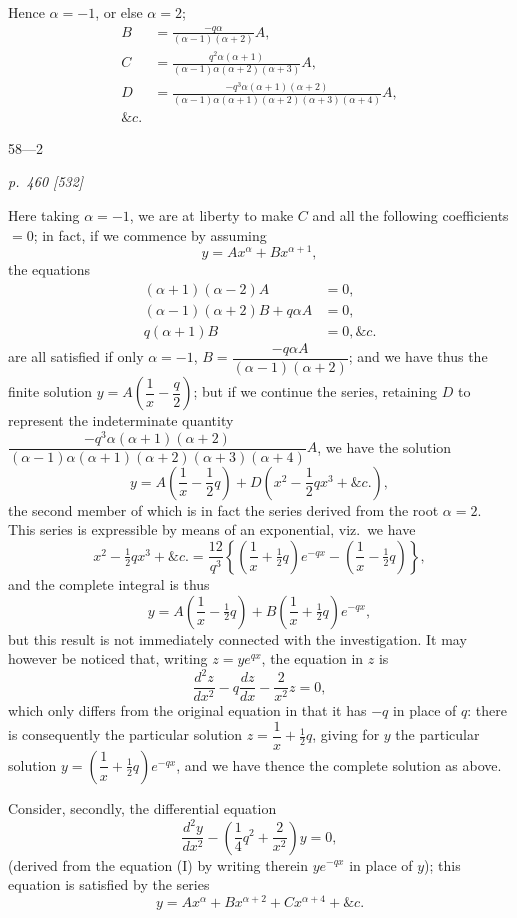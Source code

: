 \documentclass[11pt,a4paper]{article}
\theoremstyle{plain}
\theoremstyle{definition}
\begin{document}
Hence $\alpha=-1$, or else $\alpha=2$;
\begin{align*}
B&=\frac{-q\alpha}{(\alpha-1)(\alpha+2)}A,\\
C&=\frac{q^2\alpha(\alpha+1)}{(\alpha-1)\alpha(\alpha+2)(\alpha+3)}A,\\
D&=\frac{-q^3\alpha(\alpha+1)(\alpha+2)}{(\alpha-1)\alpha(\alpha+1)(\alpha+2)(\alpha+3)(\alpha+4)}A,\\
\&c.
\end{align*}

\hfill 58---2

\clearpage

\bigskip
\textit{p.~460 [532]}
\smallskip

Here taking $\alpha = -1$, we are at liberty to make $C$ and all the following coefficients
$=0$; in fact, if we commence by assuming
\[
y = Ax^\alpha + Bx^{\alpha+1},
\]
the equations
\begin{align*}
(\alpha+1)(\alpha-2)A&=0,\\
(\alpha-1)(\alpha+2)B+q\alpha A&=0,\\
q(\alpha+1)B&=0,
\&c.
\end{align*}
are all satisfied if only $\alpha=-1$,
$B=\dfrac{-q\alpha A}{(\alpha-1)(\alpha+2)}$; and we have thus the finite
solution $y=A\left(\dfrac1x-\dfrac q2\right)$; but if we continue the series, retaining $D$ to represent the
indeterminate quantity
$\dfrac{-q^3\alpha(\alpha+1)(\alpha+2)}{(\alpha-1)\alpha(\alpha+1)(\alpha+2)(\alpha+3)(\alpha+4)}A$, we have the solution
\[
y=A\left(\frac1x-\frac12 q\right)+D\left(x^2-\frac12 qx^3+\&c.\right),
\]
the second member of which is in fact the series derived from the root $\alpha=2$.
This series is expressible by means of an exponential, viz.\ we have
\[
x^2-\tfrac12 qx^3+\&c.=\frac{12}{q^3}\left\{\left(\frac1x+\tfrac12q\right)e^{-qx}
-\left(\frac1x-\tfrac12q\right)\right\},
\]
and the complete integral is thus
\[
y=A\left(\frac1x-\tfrac12q\right)+B\left(\frac1x+\tfrac12q\right)e^{-qx},
\]
but this result is not immediately connected with the investigation. It may however
be noticed that, writing $z=ye^{qx}$, the equation in $z$ is
\[
\frac{d^2z}{dx^2}-q\frac{dz}{dx}-\frac{2}{x^2}z=0,
\]
which only differs from the original equation in that it has $-q$ in place of $q$:
there is consequently the particular solution $z=\dfrac1x+\tfrac12q$, giving for $y$ the particular
solution $y=\left(\dfrac1x+\tfrac12q\right)e^{-qx}$, and we have thence the complete solution as above.

Consider, secondly, the differential equation
\[
\frac{d^2y}{dx^2}-\left(\frac14q^2+\frac{2}{x^2}\right)y=0 \tag{II},
\]
(derived from the equation (I) by writing therein $ye^{-qx}$ in place of $y$); this equation
is satisfied by the series
\[
y=Ax^\alpha+Bx^{\alpha+2}+Cx^{\alpha+4}+\&c.
\]
\end{document}
